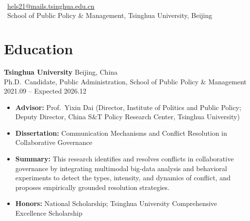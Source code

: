 \documentclass[11pt, a4paper]{article}
\begin{document}
\begin{minipage}[t]{\textwidth}
    \vspace{0.2cm}
    {\fontsize{26pt}{32pt}\selectfont\bfseries{}} \\[10pt]

    \faEnvelope \
    \href{mailto:hels21@mails.tsinghua.edu.cn}{hels21@mails.tsinghua.edu.cn} \\[3pt]

    \faMapMarker* \
    School of Public Policy \& Management, Tsinghua University, Beijing
\end{minipage}

\vspace{14pt}

\section{Education}

\textbf{Tsinghua University} \hfill Beijing, China \\
Ph.D.\ Candidate, Public Administration, School of Public Policy \& Management
\hfill 2021.09 -- Expected 2026.12
\begin{itemize}
    \item \textbf{Advisor:} Prof.\ Yixin Dai (Director, Institute of Politics and Public Policy;
    Deputy Director, China S\&T Policy Research Center, Tsinghua University)
    \item \textbf{Dissertation:} Communication Mechanisms and Conflict Resolution in
    Collaborative Governance
    \item \textbf{Summary:} This research identifies and resolves conflicts in collaborative
    governance by integrating multimodal big-data analysis and behavioral experiments to
    detect the types, intensity, and dynamics of conflict, and proposes empirically grounded
    resolution strategies.
    \item \textbf{Honors:} National Scholarship; Tsinghua University Comprehensive Excellence
    Scholarship
\end{itemize}

\vspace{6pt}
\end{document}
